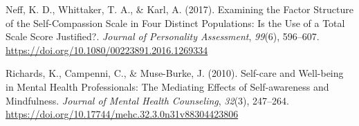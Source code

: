 \documentclass[10pt]{article}
\begin{document}
\label{csl:1}Neff, K. D., Whittaker, T. A., \& Karl, A. (2017). {Examining the {Factor} {Structure} of the {Self}-{Compassion} {Scale} in {Four} {Distinct} {Populations}: {Is} the {Use} of a {Total} {Scale} {Score} {Justified}?}. \textit{Journal of Personality Assessment}, \textit{99}(6), 596–607. \url{https://doi.org/10.1080/00223891.2016.1269334}

\label{csl:6}Richards, K., Campenni, C., \& Muse-Burke, J. (2010). {Self-care and Well-being in Mental Health Professionals: The Mediating Effects of Self-awareness and Mindfulness}. \textit{Journal of Mental Health Counseling}, \textit{32}(3), 247–264. \url{https://doi.org/10.17744/mehc.32.3.0n31v88304423806}
\end{document}

